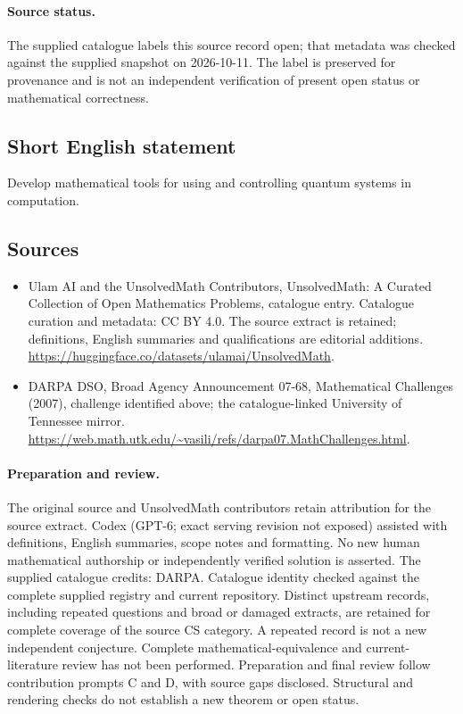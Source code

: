 \documentclass[11pt]{article}
\begin{document}
\paragraph{Source status.}
The supplied catalogue labels this source record open; that metadata was checked against the supplied snapshot on 2026-10-11. The label is preserved for provenance and is not an independent verification of present open status or mathematical correctness.
\subsection{Short English statement}
Develop mathematical tools for using and controlling quantum systems in computation.
\subsection{Sources}
\begin{itemize}
\item[\hypertarget{source:statement:1}{S1}] Ulam AI and the UnsolvedMath Contributors, UnsolvedMath: A Curated Collection of Open Mathematics Problems, catalogue entry. Catalogue curation and metadata: CC BY 4.0. The source extract is retained; definitions, English summaries and qualifications are editorial additions.
\url{https://huggingface.co/datasets/ulamai/UnsolvedMath}.
\item[\hypertarget{source:statement:2}{S2}] DARPA DSO, Broad Agency Announcement 07-68, Mathematical Challenges (2007), challenge identified above; the catalogue-linked University of Tennessee mirror.
\url{https://web.math.utk.edu/~vasili/refs/darpa07.MathChallenges.html}.
\end{itemize}
\paragraph{Preparation and review.}
The original source and UnsolvedMath contributors retain attribution for the source extract. Codex (GPT-6; exact serving revision not exposed) assisted with definitions, English summaries, scope notes and formatting. No new human mathematical authorship or independently verified solution is asserted. The supplied catalogue credits: DARPA. Catalogue identity checked against the complete supplied registry and current repository. Distinct upstream records, including repeated questions and broad or damaged extracts, are retained for complete coverage of the source CS category. A repeated record is not a new independent conjecture. Complete mathematical-equivalence and current-literature review has not been performed. Preparation and final review follow contribution prompts C and D, with source gaps disclosed. Structural and rendering checks do not establish a new theorem or open status.
\label{end:statement}
\end{document}
